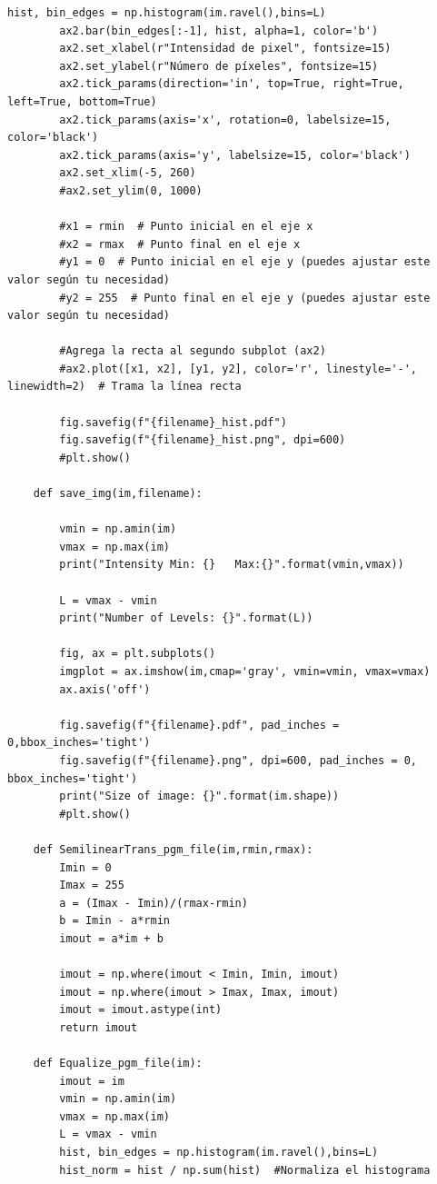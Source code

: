 \documentclass[11pt,twocolumn,twoside]{opticajnl}
\begin{document}
\begin{onecolumn}
\begin{lstlisting}[style=mystyle]
        hist, bin_edges = np.histogram(im.ravel(),bins=L)
        ax2.bar(bin_edges[:-1], hist, alpha=1, color='b')
        ax2.set_xlabel(r"Intensidad de pixel", fontsize=15)
        ax2.set_ylabel(r"Número de píxeles", fontsize=15)
        ax2.tick_params(direction='in', top=True, right=True, left=True, bottom=True)
        ax2.tick_params(axis='x', rotation=0, labelsize=15, color='black')
        ax2.tick_params(axis='y', labelsize=15, color='black')
        ax2.set_xlim(-5, 260)
        #ax2.set_ylim(0, 1000)
    
        #x1 = rmin  # Punto inicial en el eje x
        #x2 = rmax  # Punto final en el eje x
        #y1 = 0  # Punto inicial en el eje y (puedes ajustar este valor según tu necesidad)
        #y2 = 255  # Punto final en el eje y (puedes ajustar este valor según tu necesidad)
    
        #Agrega la recta al segundo subplot (ax2)
        #ax2.plot([x1, x2], [y1, y2], color='r', linestyle='-', linewidth=2)  # Trama la línea recta
    
        fig.savefig(f"{filename}_hist.pdf")
        fig.savefig(f"{filename}_hist.png", dpi=600)
        #plt.show()
    
    def save_img(im,filename):
        
        vmin = np.amin(im)
        vmax = np.max(im)
        print("Intensity Min: {}   Max:{}".format(vmin,vmax))
    
        L = vmax - vmin
        print("Number of Levels: {}".format(L))
    
        fig, ax = plt.subplots()
        imgplot = ax.imshow(im,cmap='gray', vmin=vmin, vmax=vmax)
        ax.axis('off')
    
        fig.savefig(f"{filename}.pdf", pad_inches = 0,bbox_inches='tight')
        fig.savefig(f"{filename}.png", dpi=600, pad_inches = 0, bbox_inches='tight')
        print("Size of image: {}".format(im.shape))
        #plt.show()
    
    def SemilinearTrans_pgm_file(im,rmin,rmax):
        Imin = 0
        Imax = 255
        a = (Imax - Imin)/(rmax-rmin)
        b = Imin - a*rmin  
        imout = a*im + b
    
        imout = np.where(imout < Imin, Imin, imout)
        imout = np.where(imout > Imax, Imax, imout)
        imout = imout.astype(int)
        return imout
    
    def Equalize_pgm_file(im):
        imout = im 
        vmin = np.amin(im)
        vmax = np.max(im)
        L = vmax - vmin
        hist, bin_edges = np.histogram(im.ravel(),bins=L)
        hist_norm = hist / np.sum(hist)  #Normaliza el histograma
    

\end{lstlisting}
\end{onecolumn}
\end{document}
